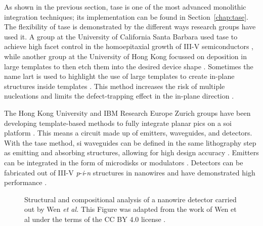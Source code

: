 As shown in the previous section, \acs{tase} is one of the most advanced monolithic integration techniques; its implementation can be found in Section~\ref{chap:tase}. The flexibility of \acs{tase} is demonstrated by the different ways research groups have used it. A group at the University of California Santa Barbara used \acs{tase} to achieve high facet control in the homoepitaxial growth of III-V semiconductors \cite{Brunelli2019, Goswami2020, Goswami2021}, while another group at the University of Hong Kong focussed on deposition in large templates \cite{Han2020, Yan2021} to then etch them into the desired device shape \cite{Han2020_2, Huang2024}. Sometimes the name \acf{lart} is used to highlight the use of large templates to create in-plane structures inside templates \cite{Han2020_2}. This method increases the risk of multiple nucleations and limits the defect-trapping effect in the in-plane direction \cite{Han2020, Yan2021, Huang2024}. 

The Hong Kong University and IBM Research Europe Zurich groups have been developing template-based methods to fully integrate planar \acs{pic}s on a \acs{soi} platform \cite{Mauthe2020}. This means a circuit made up of emitters, waveguides, and detectors. With the \acs{tase} method, \acl{si} waveguides can be defined in the same lithography step as emitting and absorbing structures, allowing for high design accuracy \cite{Wen2022}. Emitters can be integrated in the form of microdisks \cite{Tiwari2020, Tiwari2021} or modulators \cite{Scherrer2022, Scherrer2024}. Detectors can be fabricated out of III-V \textit{p}-\textit{i}-\textit{n} structures in nanowires and have demonstrated high performance \cite{Mauthe2020, Wen2022}.

\begin{figure}
    \centering
    \caption[Structural and compositional analysis of a nanowire detector.]{Structural and compositional analysis of a nanowire detector carried out by Wen \textit{et al.} This Figure was adapted from the work of Wen et al \cite{Wen2022} under the terms of the CC BY 4.0 license \cite{CCBY40}.}
    \label{fig:wen}
\end{figure}

